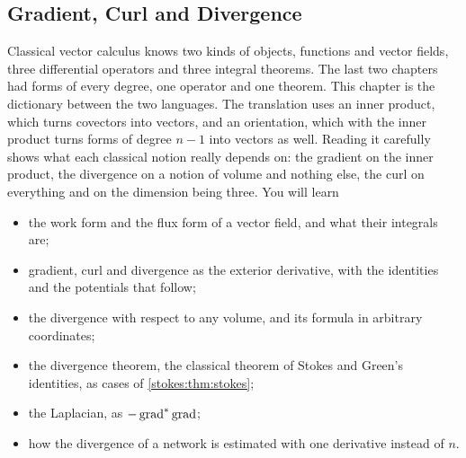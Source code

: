 \begin{notechapter}
\chapter{Gradient, Curl and Divergence}
\label{ch:vector-calculus}

\begin{chapterintro}
Classical vector calculus knows two kinds of objects, functions and
vector fields, three differential operators and three integral
theorems. The last two chapters had forms of every degree, one
operator and one theorem. This chapter is the dictionary between the
two languages. The translation uses an inner product, which turns
covectors into vectors, and an orientation, which with the inner
product turns forms of degree $n - 1$ into vectors as well. Reading it
carefully shows what each classical notion really depends on: the
gradient on the inner product, the divergence on a notion of volume
and nothing else, the curl on everything and on the dimension being
three. You will learn
\begin{itemize}[nosep]
  \item the work form and the flux form of a vector field, and what
        their integrals are;
  \item gradient, curl and divergence as the exterior derivative, with
        the identities and the potentials that follow;
  \item the divergence with respect to any volume, and its formula in
        arbitrary coordinates;
  \item the divergence theorem, the classical theorem of Stokes and
        Green's identities, as cases of \cref{stokes:thm:stokes};
  \item the Laplacian, as $-\operatorname{grad}^{*}\operatorname{grad}$;
  \item how the divergence of a network is estimated with one
        derivative instead of $n$.
\end{itemize}
\end{chapterintro}


\end{notechapter}
